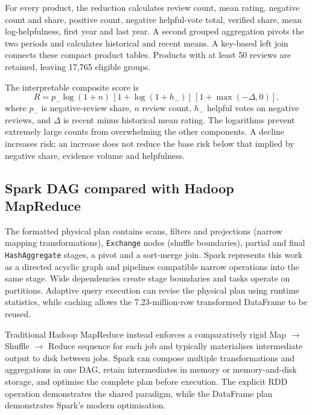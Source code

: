\documentclass[10pt,a4paper]{article}
\begin{document}
For every product, the reduction calculates review count, mean rating, negative count and share, positive count, negative helpful-vote total, verified share, mean log-helpfulness, first year and last year. A second grouped aggregation pivots the two periods and calculates historical and recent means. A key-based left join connects these compact product tables. Products with at least 50 reviews are retained, leaving 17,765 eligible groups.

The interpretable composite score is
\[
R = p_-\log(1+n)\,[1+\log(1+h_-)]\,[1+\max(-\Delta,0)],
\]
where $p_-$ is negative-review share, $n$ review count, $h_-$ helpful votes on negative reviews, and $\Delta$ is recent minus historical mean rating. The logarithms prevent extremely large counts from overwhelming the other components. A decline increases risk; an increase does not reduce the base risk below that implied by negative share, evidence volume and helpfulness.

\subsection{Spark DAG compared with Hadoop MapReduce}

The formatted physical plan contains scans, filters and projections (narrow mapping transformations), \texttt{Exchange} nodes (shuffle boundaries), partial and final \texttt{HashAggregate} stages, a pivot and a sort-merge join. Spark represents this work as a directed acyclic graph and pipelines compatible narrow operations into the same stage. Wide dependencies create stage boundaries and tasks operate on partitions. Adaptive query execution can revise the physical plan using runtime statistics, while caching allows the 7.23-million-row transformed DataFrame to be reused.

Traditional Hadoop MapReduce instead enforces a comparatively rigid Map $\rightarrow$ Shuffle $\rightarrow$ Reduce sequence for each job and typically materialises intermediate output to disk between jobs. Spark can compose multiple transformations and aggregations in one DAG, retain intermediates in memory or memory-and-disk storage, and optimise the complete plan before execution. The explicit RDD operation demonstrates the shared paradigm, while the DataFrame plan demonstrates Spark's modern optimisation.
\end{document}
